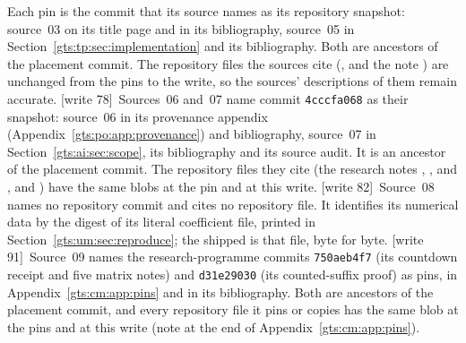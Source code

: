 \documentclass[11pt,letterpaper]{article}
\theoremstyle{definition}
\theoremstyle{remark}
\newcommand{\wtagb}{\textup{[write 78]}}
\newcommand{\wtagc}{\textup{[write 82]}}
\newcommand{\wtagd}{\textup{[write 91]}}
\begin{document}
Each pin is the commit that its source names as its repository snapshot: source~03 on its title page and in its bibliography, source~05 in Section~\ref{gts:tp:sec:implementation} and its bibliography. Both are ancestors of the placement commit. The repository files the sources cite (,  and the note ) are unchanged from the pins to the write, so the sources' descriptions of them remain accurate. \wtagb\ Sources~06 and~07 name commit \texttt{4cccfa068} as their snapshot: source~06 in its provenance appendix (Appendix~\ref{gts:po:app:provenance}) and bibliography, source~07 in Section~\ref{gts:ai:sec:scope}, its bibliography and its source audit. It is an ancestor of the placement commit. The repository files they cite (the research notes , ,  and , and ) have the same blobs at the pin and at this write. \wtagc\ Source~08 names no repository commit and cites no repository file. It identifies its numerical data by the digest of its literal coefficient file, printed in Section~\ref{gts:um:sec:reproduce}; the shipped  is that file, byte for byte. \wtagd\ Source~09 names the research-programme commits \texttt{750aeb4f7} (its countdown receipt and five matrix notes) and \texttt{d31e29030} (its counted-suffix proof) as pins, in Appendix~\ref{gts:cm:app:pins} and in its bibliography. Both are ancestors of the placement commit, and every repository file it pins or copies has the same blob at the pins and at this write (note at the end of Appendix~\ref{gts:cm:app:pins}).
\end{document}
